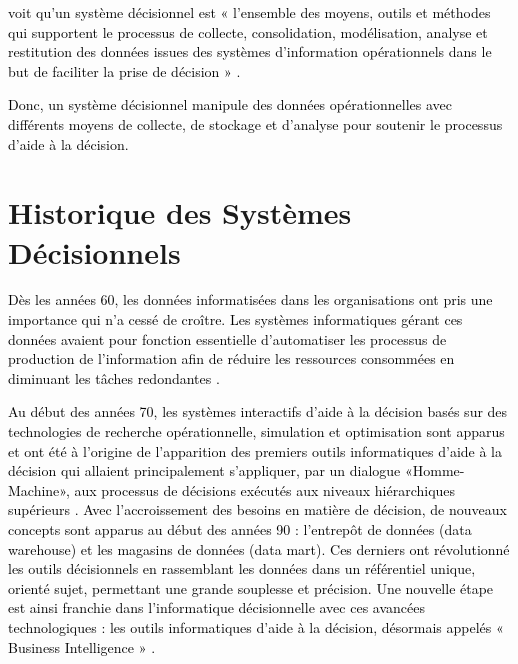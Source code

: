 \documentclass[a4paper,12pt]{report}
\begin{document}
\textcolor{black}{\citep{lau09place} voit qu’un système décisionnel est « l’ensemble des moyens, outils et méthodes qui supportent le processus de collecte, consolidation, modélisation, analyse et restitution des  données issues des systèmes d’information opérationnels dans le but de faciliter la prise de décision » \citep{lau09place}.}

\textcolor{black}{Donc, un système décisionnel manipule des données opérationnelles avec différents moyens de collecte, de stockage et d’analyse pour soutenir le processus d’aide à la décision.
	}
\section{Historique des Systèmes Décisionnels}
\textcolor{black}{Dès les années 60, les données informatisées dans les organisations ont pris une importance qui n’a cessé de croître. Les systèmes informatiques gérant ces données avaient pour fonction essentielle d’automatiser les processus de production de l’information afin de réduire les ressources consommées en diminuant les tâches redondantes \citep{teste2009modelisation}.}

\textcolor{black}{Au début des années 70, les systèmes interactifs d'aide à la décision basés sur des technologies de recherche opérationnelle, simulation et optimisation sont apparus et ont été à l'origine de l'apparition des premiers outils informatiques d'aide à la décision qui allaient principalement s'appliquer, par un dialogue «Homme-Machine», aux processus de décisions exécutés aux niveaux hiérarchiques supérieurs \citep{haouet2008informatique}. Avec l'accroissement des besoins en matière de décision, de nouveaux concepts sont apparus au début des années 90 : l'entrepôt de données (data  warehouse) et les magasins de données (data mart). Ces derniers ont révolutionné les outils décisionnels en rassemblant les données dans un référentiel unique, orienté sujet, permettant une grande souplesse et précision. Une nouvelle étape est ainsi franchie dans l'informatique décisionnelle avec ces avancées technologiques : les outils informatiques d'aide à la décision, désormais appelés «  Business Intelligence » \citep{doucet2007repenser}.} 
\end{document}
